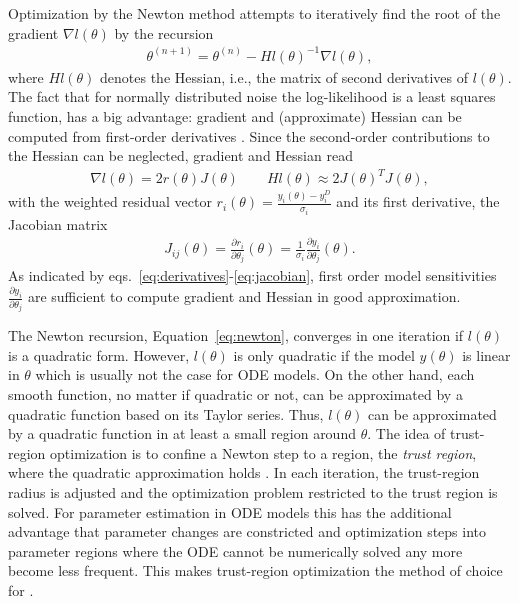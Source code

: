 \documentclass[article]{jss}
\begin{document}
Optimization by the Newton method attempts to iteratively find the root of the gradient $\nabla l (\theta)$ by the recursion
\begin{align}
\theta^{(n+1)} = \theta^{(n)} - Hl(\theta)^{-1}\nabla l(\theta),
\label{eq:newton}
\end{align}
where $Hl(\theta)$ denotes the Hessian, i.e., the matrix of second derivatives of $l(\theta)$. The fact that for normally distributed noise the log-likelihood is a least squares function, has a big advantage: gradient and (approximate) Hessian can be computed from first-order derivatives  \citep{press1996numerical}. Since the second-order contributions to the Hessian can be neglected, gradient and Hessian read
\begin{align}
\nabla l(\theta) = 2 r(\theta) J(\theta) \quad\quad Hl(\theta) \approx 2 J(\theta)^T J(\theta),
\label{eq:derivatives}
\end{align}
with the weighted residual vector $r_i(\theta) = \frac{y_i(\theta) - y_i^D}{\sigma_i}$ and its first derivative, the Jacobian matrix
\begin{align}
	J_{ij}(\theta) = \frac{\partial r_i}{\partial \theta_j}(\theta) = \frac{1}{\sigma_i} \frac{\partial y_i}{\partial \theta_j}(\theta). \label{eq:jacobian}
\end{align}
As indicated by eqs.~\eqref{eq:derivatives}-\eqref{eq:jacobian},  first order model sensitivities $\frac{\partial y_i}{\partial\theta_j}$ are sufficient to compute gradient and Hessian in good approximation.

The Newton recursion, Equation~\ref{eq:newton}, converges in one iteration if $l(\theta)$ is a quadratic form. However, $l(\theta)$ is only quadratic if the model $y(\theta)$ is linear in $\theta$ which is usually not the case for ODE models. On the other hand, each smooth function, no matter if quadratic or not, can be approximated by a quadratic function based on its Taylor series.
Thus, $l(\theta)$ can be approximated by a quadratic function in at least a small region around $\theta$. The idea of trust-region optimization is to confine a Newton step to a region, the \textit{trust region}, where the quadratic approximation holds \citep{wright1999numerical}.
In each iteration, the trust-region radius is adjusted and the optimization problem restricted to the trust region is solved. For parameter estimation in ODE models this has the additional advantage that parameter changes are constricted and optimization steps into parameter regions where the ODE cannot be numerically solved any more  become less frequent. This makes trust-region optimization the method of choice for .
\end{document}

